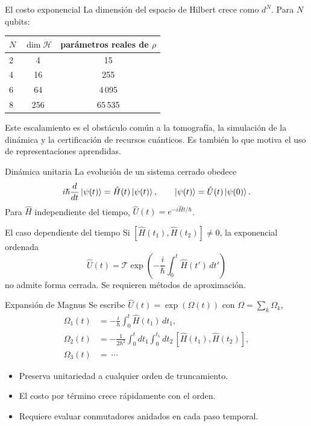\documentclass[10pt,aspectratio=169]{beamer}
\newcommand{\Hil}{\mathcal{H}}
\newcommand{\Uop}{\hat{U}}
\newcommand{\Hop}{\hat{H}}
\newcommand{\dens}{\rho}
\begin{document}
\begin{frame}{El costo exponencial}
  La dimensión del espacio de Hilbert crece como $d^N$. Para $N$ qubits:
  \vfill
  \begin{center}
  \begin{tabular}{lcc}
    \toprule
    $N$ & $\dim \Hil$ & parámetros reales de $\dens$ \\
    \midrule
    2  & 4    & 15 \\
    4  & 16   & 255 \\
    6  & 64   & 4\,095 \\
    8  & 256  & 65\,535 \\
    \bottomrule
  \end{tabular}
  \end{center}
  \vfill
  \pause
  Este escalamiento es el obstáculo común a la tomografía, la simulación de la dinámica y la certificación de recursos cuánticos. Es también lo que motiva el uso de representaciones aprendidas.
\end{frame}

\begin{frame}{Dinámica unitaria}
  La evolución de un sistema cerrado obedece
  \[
    i\hbar \frac{d}{dt}\ket{\psi(t)} = \Hop(t)\ket{\psi(t)}, \qquad \ket{\psi(t)} = \Uop(t)\ket{\psi(0)} .
  \]
  \pause
  Para $\Hop$ independiente del tiempo, $\Uop(t) = e^{-i\Hop t/\hbar}$.
  \pause
  \vfill
  \begin{alertblock}{El caso dependiente del tiempo}
    Si $[\Hop(t_1), \Hop(t_2)] \neq 0$, la exponencial ordenada
    \[
      \Uop(t) = \mathcal{T}\exp\left(-\frac{i}{\hbar}\int_0^t \Hop(t')\,dt'\right)
    \]
    no admite forma cerrada. Se requieren métodos de aproximación.
  \end{alertblock}
\end{frame}

\begin{frame}{Expansión de Magnus}
  Se escribe $\Uop(t) = \exp(\Omega(t))$ con $\Omega = \sum_k \Omega_k$,
  \begin{align*}
    \Omega_1(t) &= -\frac{i}{\hbar}\int_0^t \Hop(t_1)\,dt_1, \\
    \Omega_2(t) &= -\frac{1}{2\hbar^2}\int_0^t\!\! dt_1 \int_0^{t_1}\!\! dt_2\, [\Hop(t_1),\Hop(t_2)], \\
    \Omega_3(t) &= \ \cdots
  \end{align*}
  \pause
  \begin{itemize}
    \item Preserva unitariedad a cualquier orden de truncamiento.
    \item El costo por término crece rápidamente con el orden.
    \item Requiere evaluar conmutadores anidados en cada paso temporal.
  \end{itemize}
\end{frame}
\end{document}
